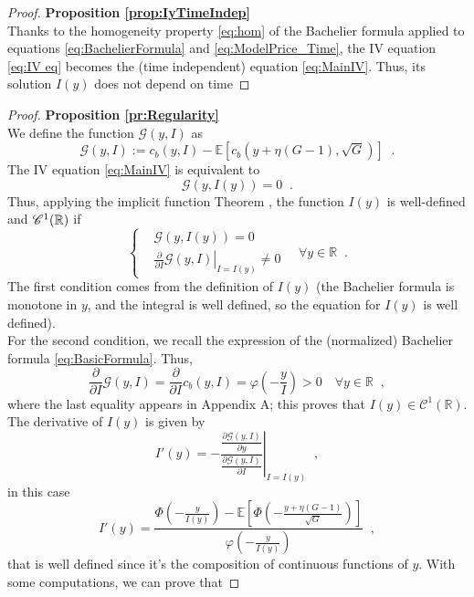 \documentclass[12pt]{article}
\theoremstyle{definition}
\theoremstyle{remark}
\numberwithin{theorem}{section}
\numberwithin{proposition}{section}
\numberwithin{lemma}{section}
\numberwithin{corollary}{section}
\numberwithin{definition}{section}
\numberwithin{remark}{section}
\numberwithin{example}{section}
\begin{document}
\smallskip
\begin{proof}{\bf Proposition \ref{prop:IyTimeIndep}}\\
Thanks to the homogeneity property \eqref{eq:hom} of the Bachelier formula applied to equations  \eqref{eq:BachelierFormula} and \eqref{eq:ModelPrice_Time}, 
the IV equation  \eqref{eq:IV eq} becomes the (time independent) equation \eqref{eq:MainIV}.
Thus, its solution ${I}(y)$ does not depend on time
\end{proof}
\smallskip
\begin{proof}{\bf Proposition \ref{pr:Regularity}}\\
We define the function $\mathcal{G}(y,I)$ as
\[
\mathcal{G}(y,I):=c_b(y,I)-\mathbb{E}\left[c_b \left(y+\eta (G-1),\sqrt{G} \right) \right]\;\;.
\]
The IV equation \eqref{eq:MainIV} is equivalent to 
\[
\mathcal{G}(y,I(y))=0\;\;.
\]
Thus, applying the implicit function Theorem \citep[see, e.g.,][Thm.9.18, p.196]{rudin1976principles},  the function $I(y)$ is well-defined and ${\cal C}^1(\mathbb{R})$ if
\begin{equation*}
    \begin{cases}
        &\mathcal{G}(y,I(y))=0\\[3mm]
        &\displaystyle \left. \frac{\partial}{\partial I}\mathcal{G}(y,I)\right|_{I=I(y)}\neq 0
    \end{cases}\quad\forall y\in\mathbb{R}\;\;.
\end{equation*}
The first condition comes from the definition of $I(y)$ (the Bachelier formula is monotone in $y$, and the integral is well defined, so the equation for $I(y)$ is well defined).\\
For the second condition, we recall the expression of the (normalized) Bachelier formula \eqref{eq:BasicFormula}.
Thus,
\[
\frac{\partial}{\partial I}\mathcal{G}(y,I)=\frac{\partial}{\partial I}c_b(y,I)=\varphi\left(-\frac{y}{I}\right)>0\quad\forall y\in\mathbb{R}\;\;,
\]
where the last equality appears in Appendix A; this proves that $I(y)\in\mathcal{C}^1(\mathbb{R})$.\\
The derivative of $I(y)$ is given by
\[
I'(y)=- \left. \frac{\frac{\partial\mathcal{G}(y,I)}{\partial y}}{\frac{\partial\mathcal{G}(y,I)}{\partial I}}\right|_{I=I(y)}\;\;,
\]
in this case
\begin{equation}
I'(y)=\frac{\Phi\left(-\frac{y}{I(y)}\right)-\mathbb{E}\left[\Phi \left(-\frac{y+\eta(G-1)}{\sqrt{G}}\right)\right]}{\varphi\left(-\frac{y}{I(y)}\right)}\;\;,
\label{eq:I_first_der}    
\end{equation}
that is well defined since it's the composition of continuous functions of $y$.
With some computations, we can prove that


\end{proof}
\end{document}
